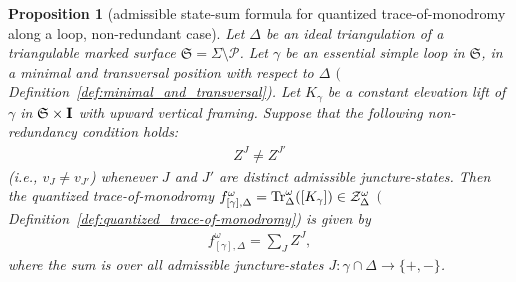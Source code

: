 \documentclass[pdftex]{sigma}
\numberwithin{equation}{section}
\newtheorem{Proposition}[Theorem]{Proposition}
\theoremstyle{definition}
\begin{document}
\begin{Proposition}[admissible state-sum formula for quantized trace-of-monodromy along a loop, non-redundant case]
\label{prop:BW_admissible_sum_formula}
Let $\Delta$ be an ideal triangulation of a triangulable marked surface $\mathfrak{S} = \Sigma\setminus\mathcal{P}$. Let $\gamma$ be an essential simple loop in $\mathfrak{S}$, in a minimal and transversal position with respect to $\Delta$ $($Definition~{\rm \ref{def:minimal_and_transversal})}. Let $K_\gamma$ be a constant elevation lift of $\gamma$ in $\mathfrak{S} \times {\bf I}$ with upward vertical framing. Suppose that the following {\em non-redundancy} condition holds:
\begin{align}
\label{eq:admissible_non-redundancy_condition}
Z^J \neq Z^{J'}
\end{align}
(i.e., $v_J\neq v_{J'}$) whenever $J$ and $J'$ are distinct admissible juncture-states.
Then the quantized trace-of-monodromy $f^\omega_{[\gamma],\Delta} = {\rm Tr}^\omega_\Delta([K_\gamma]) \in \mathcal{Z}^\omega_\Delta$ $($Definition~{\rm \ref{def:quantized_trace-of-monodromy})} is given by
\begin{align}
\label{eq:admissible_sum_formula}
f^\omega_{[\gamma],\Delta}
= \sum_J Z^J,
\end{align}
where the sum is over all admissible juncture-states $J \colon \gamma\cap \Delta \to \{+,-\}$.
\end{Proposition}
\end{document}
